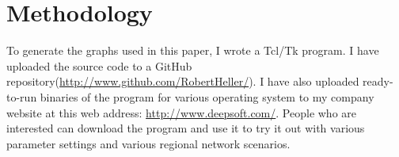 \documentclass[12pt]{article}
\begin{document}
\appendix

\section{Methodology}

To generate the graphs used in this paper, I wrote a Tcl/Tk 
program\cite{MLPCostGraphs}.  I have uploaded the source code to a GitHub 
repository(\url{http://www.github.com/RobertHeller/}).  I have also uploaded 
ready-to-run binaries of the program for various operating system to my 
company website at this web address: \url{http://www.deepsoft.com/}.  People 
who are interested can download the program and use it to try it out with 
various parameter settings and various regional network scenarios.

\clearpage
{}


\clearpage
{}
\printindex
\end{document}
